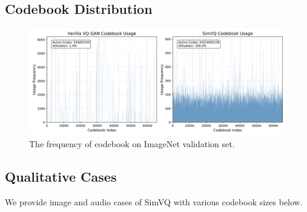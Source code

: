 \subsection{Codebook Distribution}
\label{appendix:freq}

\begin{figure}[htb]
    \centering
    \includegraphics[width=1.0\columnwidth]{material/indices_frequency_comparison.png}
    \caption{The frequency of codebook on ImageNet validation set.}
    \label{fig:freq}
\end{figure}




\subsection{Qualitative Cases}
\label{appendix:cases}

We provide image and audio cases of SimVQ with various codebook sizes below.


